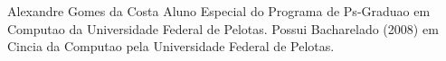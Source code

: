 \documentclass[12pt,a4paper,compsoc]{IEEEtran}
\begin{document}
\begin{IEEEbiography}{Alexandre Gomes da Costa}
Aluno Especial do Programa de Ps-Graduao em Computao da Universidade Federal de Pelotas. Possui Bacharelado (2008) em Cincia da Computao pela Universidade Federal de Pelotas.
\end{IEEEbiography}
\end{document}
